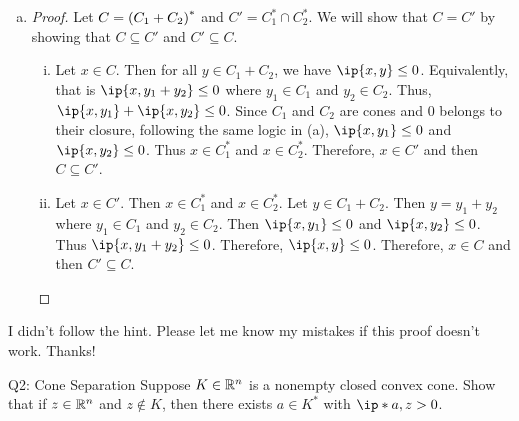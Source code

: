 \documentclass{article}
\begin{document}
\begin{solution}
\begin{enumerate}[(a)]
{\begin{proof}
\begin{enumerate}[(i)]
                    \item {
                        Let $x\in C'$. Then $x\in C_i^*$ for all $i\in I$. Let $y\in \cup_{i\in I}C_i$. Then $y_i\in C_i$ for $i\in I$. Then $\ip{x,y_i}\leq 0$. Thus $\ip{x,y}\leq 0$. Therefore, $x\in C$ and then $C'\subseteq C$.
                    }
                \end{enumerate}
            \end{proof}
        }
        \item {
            \begin{proof}
                Let $C=\parens*{C_1+C_2}^*$ and $C'=C_1^*\cap C_2^*$. We will show that $C=C'$ by showing that $C\subseteq C'$ and $C'\subseteq C$.
                \begin{enumerate}[(i)]
                    \item {
                        Let $x\in C$. Then for all $y\in C_1+C_2$, we have $\ip{x,y}\leq 0$. Equivalently, that is $\ip{x,y_1+y_2}\leq0$ where $y_1\in C_1$ and $y_2\in C_2$. Thus, $\ip{x,y_1}+\ip{x,y_2}\leq 0$. Since $C_1$ and $C_2$ are cones and $0$ belongs to their closure, following the same logic in (a), $\ip{x,y_1}\leq 0$ and $\ip{x,y_2}\leq 0$. Thus $x\in C_1^*$ and $x\in C_2^*$. Therefore, $x\in C'$ and then $C\subseteq C'$.
                    }
                    \item {
                        Let $x\in C'$. Then $x\in C_1^*$ and $x\in C_2^*$. Let $y\in C_1+C_2$. Then $y=y_1+y_2$ where $y_1\in C_1$ and $y_2\in C_2$. Then $\ip{x,y_1}\leq 0$ and $\ip{x,y_2}\leq 0$. Thus $\ip{x,y_1+y_2}\leq 0$. Therefore, $\ip{x,y}\leq 0$. Therefore, $x\in C$ and then $C'\subseteq C$.
                    }
                \end{enumerate}
            \end{proof}
        }
    \end{enumerate}
    I didn't follow the hint. Please let me know my mistakes if this proof doesn't work. Thanks!
\end{solution}

\begin{problem}
    {Q2: Cone Separation}
    Suppose $K\in\R^n$ is a nonempty closed convex cone. Show that if $z\in \R^n$ and $z\notin K$, then there exists $a\in K^*$ with $\ip*{a,z}>0$.
\end{problem}
\end{document}
